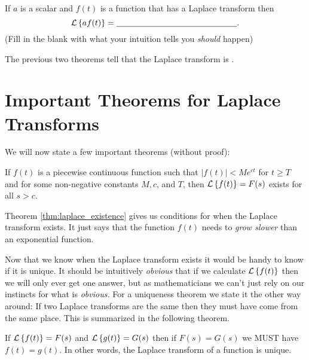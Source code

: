 \begin{thm}
    If $a$ is a scalar and $f(t)$ is a function that has a Laplace
    transform then 
    \[ \mathcal{L}\left\{ af(t) \right\} = \underline{\hspace{2in}}. \]
    (Fill in the blank with what your intuition tells you {\it should} happen)
\end{thm}

\begin{problem}
    The previous two theorems tell that the Laplace transform is
    \underline{\hspace{1in}}.
\end{problem}



\newpage\section{Important Theorems for Laplace Transforms}
We will now state a few important theorems (without proof):

\begin{thm}\label{thm:laplace_existence}
    If $f(t)$ is a piecewise continuous function
    such that $|f(t)|< M e^{ct}$ for $t \ge T$ and for some non-negative constants $M,
    c$, and $T$, then $\mathcal{L}\left\{ f(t) \right\}=F(s)$ exists for all $s > c$.
\end{thm}
Theorem \ref{thm:laplace_existence} gives us conditions for when the Laplace transform
exists.  It just says that the function $f(t)$ needs to {\it grow slower} than an
exponential function. 

Now that we know when the Laplace transform exists it would be handy to know if it is
unique.  It should be intuitively {\it obvious} that if we calculate $\mathcal{L}\left\{ f(t) \right\}$ then we
will only ever get one answer, but as mathematicians we can't just rely on our instincts
for what is {\it obvious.}  For a uniqueness theorem we state it the other way around:  If
two Laplace transforms are the same then they must have come from the same place.  This is
summarized in the following theorem.
\begin{thm}
    If $\mathcal{L}\left\{ f(t) \right\} = F(s)$ and $\mathcal{L}\left\{ g(t) \right\} =
    G(s)$ then if $F(s) = G(s)$ we MUST have $f(t) = g(t)$.  In other words, the
    Laplace transform of a function is unique.
\end{thm}

